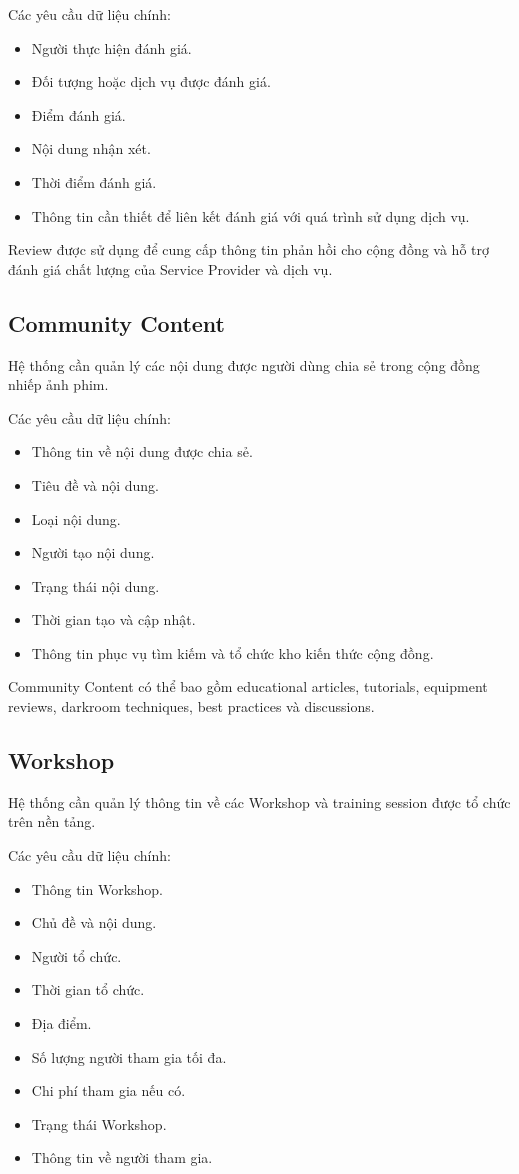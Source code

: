 Các yêu cầu dữ liệu chính:

\begin{itemize}
\item Người thực hiện đánh giá.
\item Đối tượng hoặc dịch vụ được đánh giá.
\item Điểm đánh giá.
\item Nội dung nhận xét.
\item Thời điểm đánh giá.
\item Thông tin cần thiết để liên kết đánh giá với quá trình sử dụng dịch vụ.
\end{itemize}

Review được sử dụng để cung cấp thông tin phản hồi cho cộng đồng và hỗ trợ đánh giá chất lượng của Service Provider và dịch vụ.

\subsection{Community Content}

Hệ thống cần quản lý các nội dung được người dùng chia sẻ trong cộng đồng nhiếp ảnh phim.

Các yêu cầu dữ liệu chính:

\begin{itemize}
\item Thông tin về nội dung được chia sẻ.
\item Tiêu đề và nội dung.
\item Loại nội dung.
\item Người tạo nội dung.
\item Trạng thái nội dung.
\item Thời gian tạo và cập nhật.
\item Thông tin phục vụ tìm kiếm và tổ chức kho kiến thức cộng đồng.
\end{itemize}

Community Content có thể bao gồm educational articles, tutorials, equipment reviews, darkroom techniques, best practices và discussions.

\subsection{Workshop}

Hệ thống cần quản lý thông tin về các Workshop và training session được tổ chức trên nền tảng.

Các yêu cầu dữ liệu chính:

\begin{itemize}
\item Thông tin Workshop.
\item Chủ đề và nội dung.
\item Người tổ chức.
\item Thời gian tổ chức.
\item Địa điểm.
\item Số lượng người tham gia tối đa.
\item Chi phí tham gia nếu có.
\item Trạng thái Workshop.
\item Thông tin về người tham gia.
\end{itemize}

